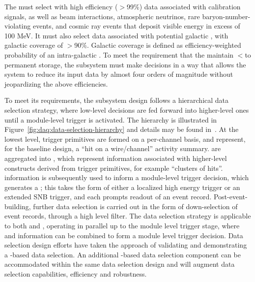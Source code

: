The  must select with high efficiency ($>$99\%) data associated with calibration
signals, as well as beam interactions,
atmospheric neutrinos, rare baryon-number-violating events, and cosmic
ray events that deposit visible energy in excess of 100 MeV. 
It must also select data associated with potential galactic , with galactic coverage
of $>$90\%. Galactic coverage is defined as efficiency-weighted probability of an intra-galactic . 
To meet the requirement that the   maintain
$<$\offsitepbpy to permanent storage, the 
subsystem must make  decisions in a way that allows the  
system to reduce its input data by almost four orders of magnitude
without jeopardizing the above efficiencies.

To meet its requirements, the  subsystem design follows a hierarchical data selection strategy, where low-level decisions are fed forward into higher-level ones until a module-level trigger is activated. 
The hierarchy is illustrated in Figure~\ref{fig:daq:data-selection-hierarchy} and details may be found in~.
At the lowest level, trigger primitives are formed on a per-channel basis, and represent, for the baseline design, a ``hit on a wire/channel'' activity summary. 
 are aggregated into , which represent information associated with higher-level constructs derived from trigger primitives, for example ``clusters of hits''. 
 information is subsequently used to inform a module-level trigger decision, which generates a ; this takes the form of either a localized high energy trigger or an extended SNB trigger, and each prompts readout of an event record. 
Post-event-building, further data selection is carried out in the form of down-selection of event records, through a high level filter. 
The data selection strategy is applicable to both  and , operating in parallel up to the module level trigger stage, where  and  information can be combined to form a module level trigger decision. 
Data selection design efforts have taken the approach of validating and demonstrating a -based data selection.
An additional -based data selection component can be accommodated within the same data selection design and will augment data selection capabilities, efficiency and robustness.

